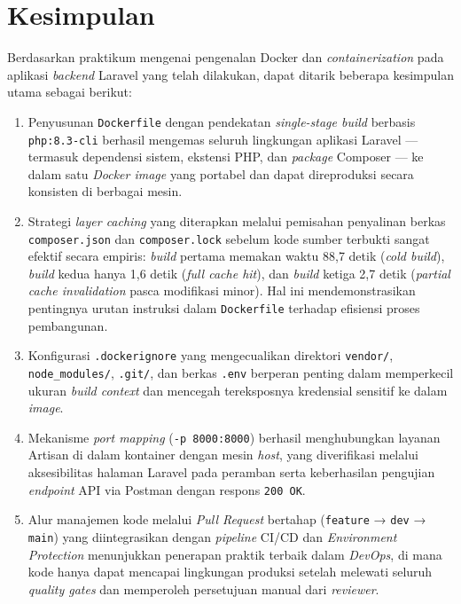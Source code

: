 \chapter{Kesimpulan}
Berdasarkan praktikum mengenai pengenalan Docker dan \textit{containerization} pada aplikasi \textit{backend} Laravel yang telah dilakukan, dapat ditarik beberapa kesimpulan utama sebagai berikut:
\begin{enumerate}
    \item Penyusunan \texttt{Dockerfile} dengan pendekatan \textit{single-stage build} berbasis \texttt{php:8.3-cli} berhasil mengemas seluruh lingkungan aplikasi Laravel — termasuk dependensi sistem, ekstensi PHP, dan \textit{package} Composer — ke dalam satu \textit{Docker image} yang portabel dan dapat direproduksi secara konsisten di berbagai mesin.
    \item Strategi \textit{layer caching} yang diterapkan melalui pemisahan penyalinan berkas \texttt{composer.json} dan \texttt{composer.lock} sebelum kode sumber terbukti sangat efektif secara empiris: \textit{build} pertama memakan waktu 88,7 detik (\textit{cold build}), \textit{build} kedua hanya 1,6 detik (\textit{full cache hit}), dan \textit{build} ketiga 2,7 detik (\textit{partial cache invalidation} pasca modifikasi minor). Hal ini mendemonstrasikan pentingnya urutan instruksi dalam \texttt{Dockerfile} terhadap efisiensi proses pembangunan.
    \item Konfigurasi \texttt{.dockerignore} yang mengecualikan direktori \texttt{vendor/}, \texttt{node\_modules/}, \texttt{.git/}, dan berkas \texttt{.env} berperan penting dalam memperkecil ukuran \textit{build context} dan mencegah tereksposnya kredensial sensitif ke dalam \textit{image}.
    \item Mekanisme \textit{port mapping} (\texttt{-p 8000:8000}) berhasil menghubungkan layanan Artisan di dalam kontainer dengan mesin \textit{host}, yang diverifikasi melalui aksesibilitas halaman Laravel pada peramban serta keberhasilan pengujian \textit{endpoint} API via Postman dengan respons \texttt{200 OK}.
    \item Alur manajemen kode melalui \textit{Pull Request} bertahap (\texttt{feature} → \texttt{dev} → \texttt{main}) yang diintegrasikan dengan \textit{pipeline} CI/CD dan \textit{Environment Protection} menunjukkan penerapan praktik terbaik dalam \textit{DevOps}, di mana kode hanya dapat mencapai lingkungan produksi setelah melewati seluruh \textit{quality gates} dan memperoleh persetujuan manual dari \textit{reviewer}.
\end{enumerate}


